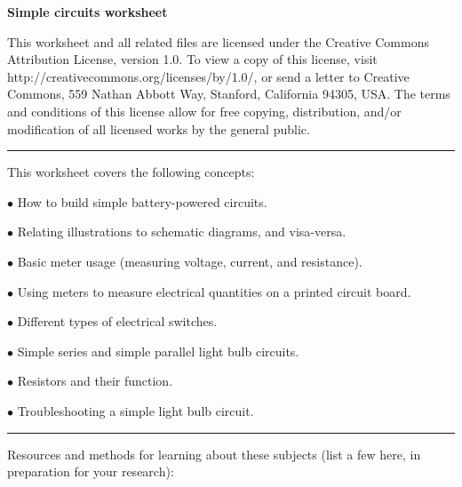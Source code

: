 
\centerline{\bf Simple circuits worksheet} \bigskip 
 
This worksheet and all related files are licensed under the Creative Commons Attribution License, version 1.0.  To view a copy of this license, visit http://creativecommons.org/licenses/by/1.0/, or send a letter to Creative Commons, 559 Nathan Abbott Way, Stanford, California 94305, USA.  The terms and conditions of this license allow for free copying, distribution, and/or modification of all licensed works by the general public.

\bigskip 

\hrule

\vskip 5pt

This worksheet covers the following concepts:

\bigskip

\item {$\bullet$} How to build simple battery-powered circuits.
\item {$\bullet$} Relating illustrations to schematic diagrams, and visa-versa.
\item {$\bullet$} Basic meter usage (measuring voltage, current, and resistance).
\item {$\bullet$} Using meters to measure electrical quantities on a printed circuit board.
\item {$\bullet$} Different types of electrical switches.
\item {$\bullet$} Simple series and simple parallel light bulb circuits. 
\item {$\bullet$} Resistors and their function. 
\item {$\bullet$} Troubleshooting a simple light bulb circuit. 

\bigskip 

\hrule

\vskip 10pt

Resources and methods for learning about these subjects (list a few here, in preparation for your research):

